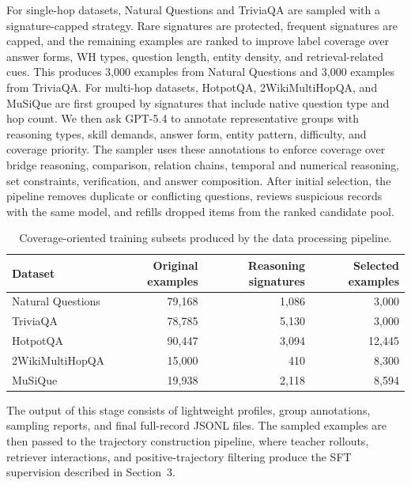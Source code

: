 \documentclass{article}
\begin{document}
For single-hop datasets, Natural Questions and TriviaQA are sampled with a signature-capped strategy. Rare signatures are protected, frequent signatures are capped, and the remaining examples are ranked to improve label coverage over answer forms, WH types, question length, entity density, and retrieval-related cues. This produces 3,000 examples from Natural Questions and 3,000 examples from TriviaQA. For multi-hop datasets, HotpotQA, 2WikiMultiHopQA, and MuSiQue are first grouped by signatures that include native question type and hop count. We then ask \textsc{GPT-5.4} to annotate representative groups with reasoning types, skill demands, answer form, entity pattern, difficulty, and coverage priority. The sampler uses these annotations to enforce coverage over bridge reasoning, comparison, relation chains, temporal and numerical reasoning, set constraints, verification, and answer composition. After initial selection, the pipeline removes duplicate or conflicting questions, reviews suspicious records with the same model, and refills dropped items from the ranked candidate pool.

\begin{table}[tbp]
  \centering
  \caption{Coverage-oriented training subsets produced by the data processing pipeline.}
  \label{tab:appendix-data-process}
  \setlength{\tabcolsep}{7pt}
  \renewcommand{\arraystretch}{1.1}
  \small
  \begin{tabular}{lrrr}
    \toprule
    \textbf{Dataset} & \textbf{Original examples} & \textbf{Reasoning signatures} & \textbf{Selected examples} \\
    \midrule
    Natural Questions & 79,168 & 1,086 & 3,000 \\
    TriviaQA & 78,785 & 5,130 & 3,000 \\
    HotpotQA & 90,447 & 3,094 & 12,445 \\
    2WikiMultiHopQA & 15,000 & 410 & 8,300 \\
    MuSiQue & 19,938 & 2,118 & 8,594 \\
    \bottomrule
  \end{tabular}
\end{table}

The output of this stage consists of lightweight profiles, group annotations, sampling reports, and final full-record JSONL files. The sampled examples are then passed to the trajectory construction pipeline, where teacher rollouts, retriever interactions, and positive-trajectory filtering produce the SFT supervision described in Section~3.
\end{document}

